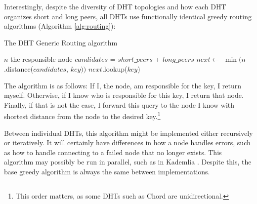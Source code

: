 \documentclass[11pt,conference]{IEEEtran}
\begin{document}
Interestingly, despite the diversity of DHT topologies and how each DHT organizes short and long peers,  all DHTs use functionally identical greedy routing algorithms (Algorithm \ref{alg:routing}):

\begin{algorithm}
	\caption{The DHT Generic Routing algorithm}
	\label{alg:routing}
	\small
	\begin{algorithmic}[1]
				\State \Return $ n $
			\EndIf
				\State \Return the responsible node
			\EndIf
			\State $ candidates $ = $ short\_peers $ + $ long\_peers $
			\State $ next  \leftarrow $  $\min (n$.distance($candidates$, $ key ))$
			\State \Return $next.$lookup($key$)
		\EndFunction
	\end{algorithmic}
	
	\scriptsize
\end{algorithm}
The algorithm is as follows:
If I, the node, am responsible for the key, I return myself.
Otherwise, if I know who is responsible for this key, I return that node.
Finally, if that is not the case, I forward this query to the node I know with shortest distance from the node to the desired key.\footnote{This order matters, as some DHTs such as Chord are unidirectional.} 

Between individual DHTs, this algorithm might be implemented either recursively or iteratively.
It will certainly have differences in how a node handles errors, such as how to handle connecting to a failed node that no longer exists.
This algorithm may possibly be  run in parallel, such as in Kademlia \cite{kademlia}.
Despite this, the base greedy algorithm is always the same between implementations.
\end{document}
